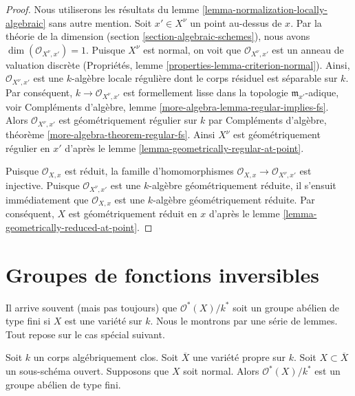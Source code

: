 \begin{proof}
 Nous utiliserons les résultats du lemme \ref{lemma-normalization-locally-algebraic}
 sans autre mention. Soit $x' \in X^\nu$ un point au-dessus de $x$.
Par la théorie de la dimension (section \ref{section-algebraic-schemes}), nous avons 
$\dim(\mathcal{O}_{X^\nu, x'}) = 1$. Puisque $X^\nu$ est normal, on
voit que $\mathcal{O}_{X^\nu, x'}$ est un anneau de valuation
discrète (Propriétés, lemme \ref{properties-lemma-criterion-normal}).
Ainsi, $\mathcal{O}_{X^\nu, x'}$ est une $k$-algèbre locale
régulière dont le corps résiduel est séparable sur $k$. Par conséquent, 
$k \to \mathcal{O}_{X^\nu, x'}$ est formellement lisse dans la
topologie $\mathfrak m_{x'}$-adique, voir
Compléments d'algèbre, lemme \ref{more-algebra-lemma-regular-implies-fs}.
Alors $\mathcal{O}_{X^\nu, x'}$ est géométriquement régulier
sur $k$
 par Compléments d'algèbre, théorème \ref{more-algebra-theorem-regular-fs}.
Ainsi $X^\nu$ est géométriquement régulier en $x'$ d'après
le lemme \ref{lemma-geometrically-regular-at-point}.

\medskip\noindent
 Puisque $\mathcal{O}_{X, x}$ est réduit, la famille d'homomorphismes 
$\mathcal{O}_{X, x} \to \mathcal{O}_{X^\nu, x'}$ est injective.
Puisque $\mathcal{O}_{X^\nu, x'}$ est une 
$k$-algèbre géométriquement réduite, il s'ensuit immédiatement que $\mathcal{O}_{X, x}$
 est une $k$-algèbre géométriquement réduite. Par conséquent, $X$ est géométriquement
réduit en $x$ d'après le lemme \ref{lemma-geometrically-reduced-at-point}. 
\end{proof}









\section{Groupes de fonctions inversibles} 
\label{section-units}

\noindent
 Il arrive souvent (mais pas toujours) que $\mathcal{O}^*(X)/k^*$
 soit un groupe abélien de type fini si $X$ est une variété sur $k$.
Nous le montrons par une série
de lemmes. Tout repose sur le cas spécial suivant.

\begin{lemma}
\label{lemma-open-in-normal-proper}
 Soit $k$ un corps algébriquement clos. Soit
$\overline{X}$ une variété propre sur $k$.
Soit $X \subset \overline{X}$ un sous-schéma ouvert.
Supposons que $X$ soit normal.
Alors $\mathcal{O}^*(X)/k^*$ est un groupe abélien de type fini. 
\end{lemma}

